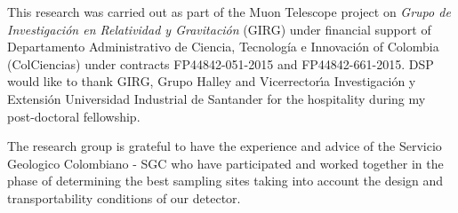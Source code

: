 \documentclass[letterpaper,11pt]{article}
\begin{document}



\acknowledgments
This research was carried out as part of the Muon Telescope project on {\it Grupo de Investigaci\'on en Relatividad y Gravitaci\'on} (GIRG) under financial support of  Departamento Administrativo de Ciencia, Tecnolog\'ia e Innovaci\'on of Colombia (ColCiencias) under contracts FP44842-051-2015 and FP44842-661-2015. DSP would like to thank GIRG, Grupo Halley and Vicerrector\'{\i}a Investigaci\'on y Extensi\'on Universidad Industrial de Santander for the hospitality during my post-doctoral fellowship.

The research group is grateful to have the experience and advice of the Servicio Geologico Colombiano - SGC who have participated and worked together in the phase of determining the best sampling sites taking into account the design and transportability conditions of our detector.




\end{document}
